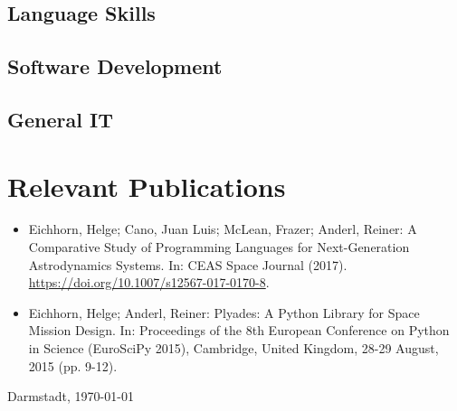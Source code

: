 \documentclass[10pt,a4paper]{moderncv}
\begin{document}
\subsection{Language Skills}

\subsection{Software Development}
\subsection{General IT}

\section{Relevant Publications}
\begin{itemize}
		\item Eichhorn, Helge; Cano, Juan Luis; McLean, Frazer; Anderl, Reiner: A Comparative Study of Programming Languages for Next-Generation Astrodynamics Systems. In: CEAS Space Journal (2017). \url{https://doi.org/10.1007/s12567-017-0170-8}.
    \item Eichhorn, Helge; Anderl, Reiner: Plyades: A Python Library for Space Mission Design. In: Proceedings of the 8th European Conference on Python in Science (EuroSciPy 2015), Cambridge, United Kingdom, 28-29 August, 2015 (pp. 9-12).
\end{itemize}
\bigskip
\bigskip
\bigskip
\bigskip
\bigskip
\bigskip

Darmstadt, \today
\end{document}
